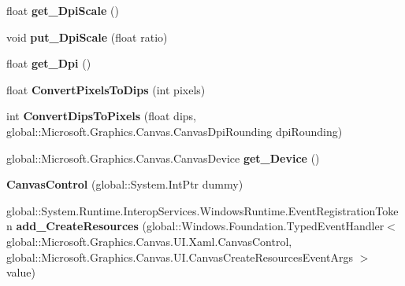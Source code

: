 \begin{DoxyCompactItemize}
float {\bfseries get\+\_\+\+Dpi\+Scale} ()
\item 
\mbox{\label{class_microsoft_1_1_graphics_1_1_canvas_1_1_u_i_1_1_xaml_1_1_canvas_control_ac93ee9daef7c500b489c7d75ea50a9c1}} 
void {\bfseries put\+\_\+\+Dpi\+Scale} (float ratio)
\item 
\mbox{\label{class_microsoft_1_1_graphics_1_1_canvas_1_1_u_i_1_1_xaml_1_1_canvas_control_a153a81ae73a3695b423fcc92a0f866f5}} 
float {\bfseries get\+\_\+\+Dpi} ()
\item 
\mbox{\label{class_microsoft_1_1_graphics_1_1_canvas_1_1_u_i_1_1_xaml_1_1_canvas_control_a2ce8d949d75e058b2815e29c1dbfbeae}} 
float {\bfseries Convert\+Pixels\+To\+Dips} (int pixels)
\item 
\mbox{\label{class_microsoft_1_1_graphics_1_1_canvas_1_1_u_i_1_1_xaml_1_1_canvas_control_a6f9406f13bc216c0fe902d20beb8d936}} 
int {\bfseries Convert\+Dips\+To\+Pixels} (float dips, global\+::\+Microsoft.\+Graphics.\+Canvas.\+Canvas\+Dpi\+Rounding dpi\+Rounding)
\item 
\mbox{\label{class_microsoft_1_1_graphics_1_1_canvas_1_1_u_i_1_1_xaml_1_1_canvas_control_a53150d7d2beb847f94799b8c1be75e7a}} 
global\+::\+Microsoft.\+Graphics.\+Canvas.\+Canvas\+Device {\bfseries get\+\_\+\+Device} ()
\item 
\mbox{\label{class_microsoft_1_1_graphics_1_1_canvas_1_1_u_i_1_1_xaml_1_1_canvas_control_a31a6da4afc396ee8034865c568463129}} 
{\bfseries Canvas\+Control} (global\+::\+System.\+Int\+Ptr dummy)
\item 
\mbox{\label{class_microsoft_1_1_graphics_1_1_canvas_1_1_u_i_1_1_xaml_1_1_canvas_control_ab026eb60db1a9fa4336dcb1ac14e4fb4}} 
global\+::\+System.\+Runtime.\+Interop\+Services.\+Windows\+Runtime.\+Event\+Registration\+Token {\bfseries add\+\_\+\+Create\+Resources} (global\+::\+Windows.\+Foundation.\+Typed\+Event\+Handler$<$ global\+::\+Microsoft.\+Graphics.\+Canvas.\+U\+I.\+Xaml.\+Canvas\+Control, global\+::\+Microsoft.\+Graphics.\+Canvas.\+U\+I.\+Canvas\+Create\+Resources\+Event\+Args $>$ value)

\end{DoxyCompactItemize}
